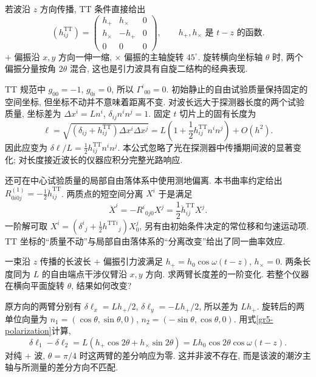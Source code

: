 若波沿 $z$ 方向传播, TT 条件直接给出
\begin{equation}\label{gr5-polarization}
 (h^{\mathrm{TT}}_{ij})=
 \begin{pmatrix}h_+&h_\times&0\\h_\times&-h_+&0\\0&0&0\end{pmatrix},
 \qquad h_+,h_\times\text{ 是 }t-z\text{ 的函数}.
\end{equation}
$+$ 偏振沿 $x,y$ 方向一伸一缩, $\times$ 偏振的主轴旋转 $45^\circ$. 旋转横向坐标轴 $\theta$ 时, 两个偏振分量按角 $2\theta$ 混合, 这也是引力波具有自旋二结构的经典表现.


TT 规范中 $g_{00}=-1$, $g_{0i}=0$, 所以 $\Gamma^i{}_{00}=0$. 初始静止的自由试验质量保持固定的空间坐标, 但坐标不动并不意味着距离不变. 对波长远大于探测器长度的两个试验质量, 坐标差为 $\Delta x^i=L n^i$, $\delta_{ij}n^in^j=1$. 固定 $t$ 切片上的固有长度为
\[
 \ell=\sqrt{(\delta_{ij}+h^{\mathrm{TT}}_{ij})\Delta x^i\Delta x^j}
 =L\left(1+\frac12 h^{\mathrm{TT}}_{ij}n^in^j\right)+O(h^2).
\]
因此应变为 $\delta\ell/L=\tfrac12h^{\mathrm{TT}}_{ij}n^in^j$. 本公式忽略了光在探测器中传播期间波的显著变化; 对长度接近波长的仪器应积分完整光路响应.

还可在中心试验质量的局部自由落体系中使用测地偏离. 本书曲率约定给出 $R_{0i0j}^{(1)}=-\tfrac12\ddot h^{\mathrm{TT}}_{ij}$. 两质点的短空间分离 $X^i$ 于是满足
\begin{equation}\label{gr5-detector}
 \ddot X^i=-R^i{}_{0j0}X^j=\frac12\ddot h^{\mathrm{TT}}_{ij}X^j.
\end{equation}
一阶解可取 $X^i=(\delta^i{}_j+\tfrac12h^{\mathrm{TT}i}{}_j)X_0^j$, 另有由初始条件决定的常位移和匀速运动项. TT 坐标的“质量不动”与局部自由落体系的“分离改变”给出了同一曲率效应.

\begin{example}
一束沿 $z$ 传播的长波长 $+$ 偏振引力波满足 $h_+=h_0\cos\omega(t-z)$, $h_\times=0$. 两条长度同为 $L$ 的自由端点干涉仪臂沿 $x,y$ 方向. 求两臂长度差的一阶变化. 若整个仪器在横向平面旋转 $\theta$, 结果如何改变?
\end{example}
\begin{solution}
原方向的两臂分别有 $\delta\ell_x=Lh_+/2$, $\delta\ell_y=-Lh_+/2$, 所以差为 $Lh_+$. 旋转后的两单位向量为 $n_1=(\cos\theta,\sin\theta,0)$, $n_2=(-\sin\theta,\cos\theta,0)$. 用式\eqref{gr5-polarization}计算,
\[
 \delta\ell_1-\delta\ell_2
 =L(h_+\cos2\theta+h_\times\sin2\theta)
 =Lh_0\cos2\theta\cos\omega(t-z).
\]
对纯 $+$ 波, $\theta=\pi/4$ 时这两臂的差分响应为零. 这并非波不存在, 而是该波的潮汐主轴与所测量的差分方向不匹配.
\end{solution}

